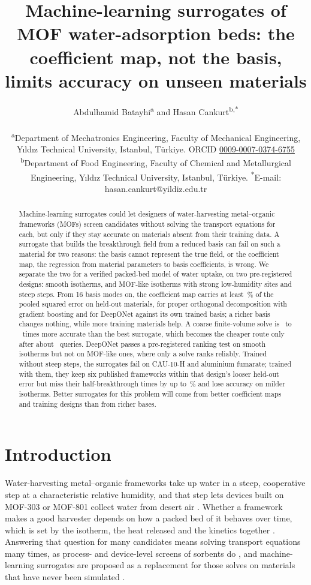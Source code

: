 \documentclass[10pt,a4paper]{article}
\title{Machine-learning surrogates of MOF water-adsorption beds: the coefficient map, not the
basis, limits accuracy on unseen materials}
\author{Abdulhamid Batayhi\textsuperscript{a} and Hasan Cankurt\textsuperscript{b,*}\\[0.6em]
\parbox{0.92\textwidth}{\centering\small
\textsuperscript{a}Department of Mechatronics Engineering, Faculty of Mechanical
Engineering, Y\i{}ld\i{}z Technical University, Istanbul, T\"urkiye.
ORCID \href{https://orcid.org/0009-0007-0374-6755}{0009-0007-0374-6755}\\[0.3em]
\textsuperscript{b}Department of Food Engineering, Faculty of Chemical and
Metallurgical Engineering, Y\i{}ld\i{}z Technical University, Istanbul, T\"urkiye.
\textsuperscript{*}E-mail: hasan.cankurt@yildiz.edu.tr}}
\date{}
\begin{document}
\maketitle

\begin{abstract}
Machine-learning surrogates could let designers of water-harvesting metal--organic
frameworks (MOFs) screen candidates without solving the transport equations for each, but
only if they stay accurate on materials absent from their training data. A surrogate that
builds the breakthrough field from a reduced basis can fail on such a material for two
reasons: the basis cannot represent the true field, or the coefficient map, the regression
from material parameters to basis coefficients, is wrong. We separate the two for a
verified packed-bed model of water uptake, on two pre-registered designs: smooth isotherms,
and MOF-like isotherms with strong low-humidity sites and steep steps. From 16 basis modes
on, the coefficient map carries at least \nShMin\,\% of the pooled squared error on held-out
materials, for proper orthogonal decomposition with gradient boosting and for DeepONet
against its own trained basis; a richer basis changes nothing, while more training
materials help. A coarse finite-volume solve is \nScrCoRatio\ to \nScrVthreeCoRatio\ times
more accurate than the best surrogate, which becomes the cheaper route only after about
\nCostBeFit\ queries. DeepONet passes a pre-registered ranking test on smooth isotherms but
not on MOF-like ones, where only a solve ranks reliably. Trained without steep steps, the
surrogates fail on CAU-10-H and aluminium fumarate; trained with them, they keep six
published frameworks within that design's looser held-out error but miss their
half-breakthrough times by up to \nFwATfiftyDonRelMax\,\% and lose accuracy on milder
isotherms. Better surrogates for this problem will come from better coefficient maps and
training designs than from richer bases.
\end{abstract}

\section{Introduction}
\label{sec:intro}

Water-harvesting metal--organic frameworks take up water in a steep, cooperative step at
a characteristic relative humidity, and that step lets devices built on MOF-303 or MOF-801
collect water from desert air
\cite{kim2017water,kim2018adsorption,hanikel2021evolution}. Whether a framework makes a
good harvester depends on how a packed bed of it behaves over time, which is set by the
isotherm, the heat released and the kinetics together
\cite{lapotin2019adsorption}. Answering that question for many candidates means solving
transport equations many times, as process- and device-level screens of sorbents do
\cite{charalambous2024holistic,wang2026bridging}, and machine-learning surrogates are
proposed as a replacement for those solves on materials that have never been simulated
\cite{leperi2019development,burns2020prediction,han2025machine,han2025optimizing}.
\end{document}
